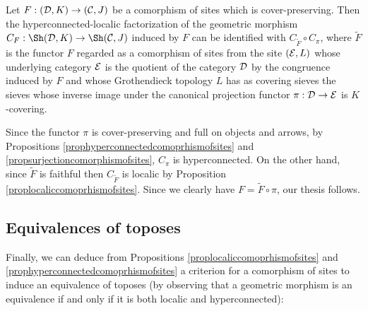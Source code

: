 \documentclass[a4paper,12pt]{article}
\begin{document}
\begin{proposition}\label{prophyperlocfactorizationcomorphismofsites}
	Let $F:({\cal D}, K)\to ({\cal C}, J)$ be a comorphism of sites which is cover-preserving. Then the hyperconnected-localic factorization of the geometric morphism $C_{F}:\Sh({\cal D}, K)\to \Sh({\cal C}, J)$ induced by $F$ can be identified with $C_{\tilde{F}}\circ C_{\pi}$, where $\tilde{F}$ is the functor $F$ regarded as a comorphism of sites from the site $({\cal E}, L)$ whose underlying category $\cal E$ is the quotient of the category $\cal D$ by the congruence induced by $F$ and whose Grothendieck topology $L$ has as covering sieves the sieves whose inverse image under the canonical projection functor $\pi:{\cal D}\to {\cal E}$ is $K$-covering.	
\end{proposition}

\begin{proofs}
	Since the functor $\pi$ is cover-preserving and full on objects and arrows, by Propositions \ref{prophyperconnectedcomoprhismofsites} and \ref{propsurjectioncomorphismofsites}, $C_{\pi}$ is hyperconnected. On the other hand, since $\tilde{F}$ is faithful then $C_{\tilde{F}}$ is localic by Proposition \ref{proplocaliccomoprhismofsites}. Since we clearly have $F=\tilde{F}\circ \pi$, our thesis follows. 
\end{proofs}

\subsection{Equivalences of toposes}

Finally, we can deduce from Propositions \ref{proplocaliccomoprhismofsites} and \ref{prophyperconnectedcomoprhismofsites} a criterion for a comorphism of sites to induce an equivalence of toposes (by observing that a geometric morphism is an equivalence if and only if it is both localic and hyperconnected):
\end{document}
